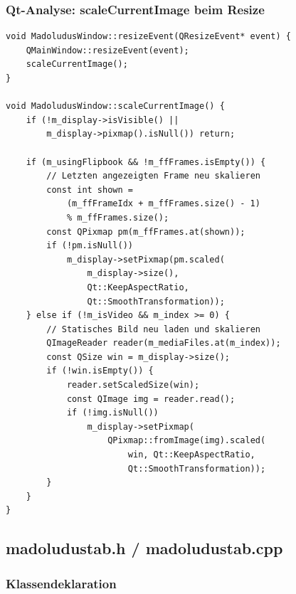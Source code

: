 \subsubsection{Qt-Analyse: scaleCurrentImage beim Resize}

\begin{lstlisting}[caption={resizeEvent: Bild neu skalieren}]
void MadoludusWindow::resizeEvent(QResizeEvent* event) {
    QMainWindow::resizeEvent(event);
    scaleCurrentImage();
}

void MadoludusWindow::scaleCurrentImage() {
    if (!m_display->isVisible() ||
        m_display->pixmap().isNull()) return;

    if (m_usingFlipbook && !m_ffFrames.isEmpty()) {
        // Letzten angezeigten Frame neu skalieren
        const int shown =
            (m_ffFrameIdx + m_ffFrames.size() - 1)
            % m_ffFrames.size();
        const QPixmap pm(m_ffFrames.at(shown));
        if (!pm.isNull())
            m_display->setPixmap(pm.scaled(
                m_display->size(),
                Qt::KeepAspectRatio,
                Qt::SmoothTransformation));
    } else if (!m_isVideo && m_index >= 0) {
        // Statisches Bild neu laden und skalieren
        QImageReader reader(m_mediaFiles.at(m_index));
        const QSize win = m_display->size();
        if (!win.isEmpty()) {
            reader.setScaledSize(win);
            const QImage img = reader.read();
            if (!img.isNull())
                m_display->setPixmap(
                    QPixmap::fromImage(img).scaled(
                        win, Qt::KeepAspectRatio,
                        Qt::SmoothTransformation));
        }
    }
}
\end{lstlisting}

\subsection{madoludustab.h / madoludustab.cpp}

\subsubsection{Klassendeklaration}

